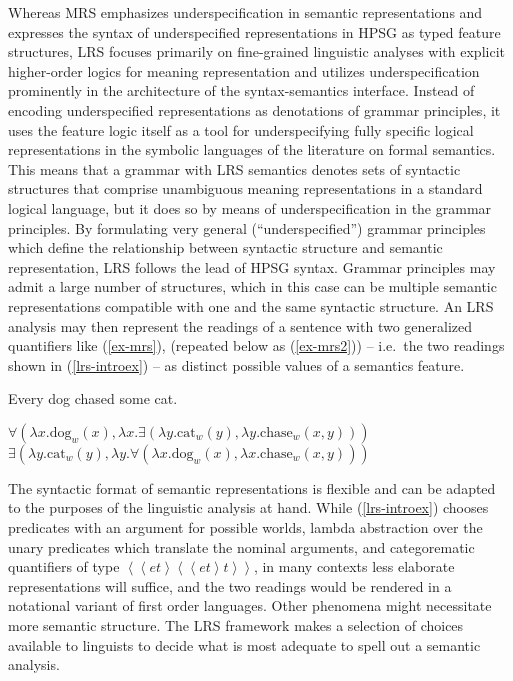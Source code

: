 \documentclass[output=paper
 	        ,biblatex
                ,babelshorthands
                ,newtxmath
                ,draftmode
                ,colorlinks, citecolor=brown
]{langscibook}
\begin{document}
Whereas MRS emphasizes underspecification in semantic representations and expresses the syntax of underspecified representations in HPSG as typed feature structures, LRS focuses primarily on fine-grained linguistic analyses with explicit higher-order logics for meaning representation and utilizes underspecification prominently in the architecture of the syntax-semantics interface. Instead of encoding underspecified representations as denotations of grammar principles, it uses the feature logic itself as a tool for underspecifying fully specific logical representations in the symbolic languages of the literature on formal semantics. This means that a grammar with LRS semantics denotes sets of syntactic structures that comprise unambiguous meaning representations in a standard logical language, but it does so by means of underspecification in the grammar principles. By formulating very general (``underspecified'') grammar principles which define the relationship between syntactic structure and semantic representation, LRS follows the lead of HPSG syntax.
Grammar principles may admit a large number of structures, which in this case can be multiple semantic representations compatible with one and the same syntactic structure. An LRS analysis may then represent the readings of a sentence with two generalized quantifiers like (\ref{ex-mrs}),  (repeated below as (\ref{ex-mrs2})) -- i.e.\ the two readings shown in (\ref{lrs-introex}) -- as distinct possible values of a semantics feature. 


\ea
\label{ex-mrs2}
Every dog chased some cat.
\z

\eal
\label{lrs-introex}
\ex\label{lrs-introex1a}
  
  $\forall \left(\lambda x.\text{dog}_w(x),\lambda x.\exists \left(\lambda y.\text{cat}_w(y),\lambda y.\text{chase}_w(x,y)\right)\right)$ 
\ex\label{lrs-introex1b}
  $\exists \left(\lambda y.\text{cat}_w(y),\lambda y.\forall \left(\lambda x.\text{dog}_w(x),\lambda x.\text{chase}_w(x,y)\right)\right)$ 
\zl


The syntactic format of semantic representations is flexible and can be adapted to the purposes of the linguistic analysis at hand. While (\ref{lrs-introex}) chooses predicates with an argument for possible worlds, lambda abstraction over the unary predicates which translate the nominal arguments, and categorematic quantifiers of type ${\left<\left<et\right>\left<\left<et\right>t\right>\right>}$, in many contexts less elaborate representations will suffice, and the two readings would be rendered in a notational variant of first order languages. Other phenomena might necessitate more semantic structure. The LRS framework makes a selection of choices available to linguists to decide what is most adequate to spell out a semantic analysis.
\end{document}
